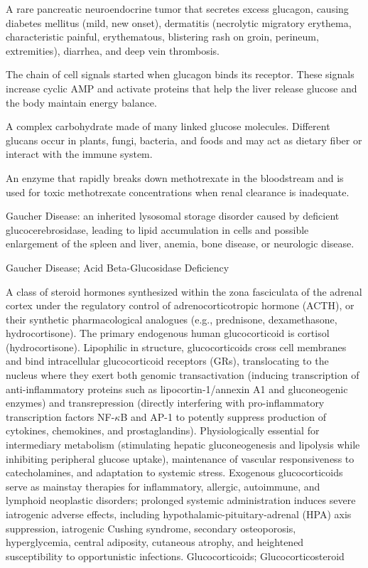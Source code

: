  A rare pancreatic neuroendocrine tumor that secretes excess glucagon, causing diabetes mellitus (mild, new onset), dermatitis (necrolytic migratory erythema, characteristic painful, erythematous, blistering rash on groin, perineum, extremities), diarrhea, and deep vein thrombosis.

 The chain of cell signals started when glucagon binds its receptor. These signals increase cyclic AMP and activate proteins that help the liver release glucose and the body maintain energy balance.

 A complex carbohydrate made of many linked glucose molecules. Different glucans occur in plants, fungi, bacteria, and foods and may act as dietary fiber or interact with the immune system.

 An enzyme that rapidly breaks down methotrexate in the bloodstream and is used for toxic methotrexate concentrations when renal clearance is inadequate.

 Gaucher Disease: an inherited lysosomal storage disorder caused by deficient glucocerebrosidase, leading to lipid accumulation in cells and possible enlargement of the spleen and liver, anemia, bone disease, or neurologic disease.

\synonyms
Gaucher Disease; Acid Beta-Glucosidase Deficiency

 A class of steroid hormones synthesized within the zona fasciculata of the adrenal cortex under the regulatory control of adrenocorticotropic hormone (ACTH), or their synthetic pharmacological analogues (e.g., prednisone, dexamethasone, hydrocortisone). The primary endogenous human glucocorticoid is cortisol (hydrocortisone). Lipophilic in structure, glucocorticoids cross cell membranes and bind intracellular glucocorticoid receptors (GRs), translocating to the nucleus where they exert both genomic transactivation (inducing transcription of anti-inflammatory proteins such as lipocortin-1/annexin A1 and gluconeogenic enzymes) and transrepression (directly interfering with pro-inflammatory transcription factors NF-$\kappa$B and AP-1 to potently suppress production of cytokines, chemokines, and prostaglandins). Physiologically essential for intermediary metabolism (stimulating hepatic gluconeogenesis and lipolysis while inhibiting peripheral glucose uptake), maintenance of vascular responsiveness to catecholamines, and adaptation to systemic stress. Exogenous glucocorticoids serve as mainstay therapies for inflammatory, allergic, autoimmune, and lymphoid neoplastic disorders; prolonged systemic administration induces severe iatrogenic adverse effects, including hypothalamic-pituitary-adrenal (HPA) axis suppression, iatrogenic Cushing syndrome, secondary osteoporosis, hyperglycemia, central adiposity, cutaneous atrophy, and heightened susceptibility to opportunistic infections.
\synonyms
Glucocorticoids; Glucocorticosteroid


